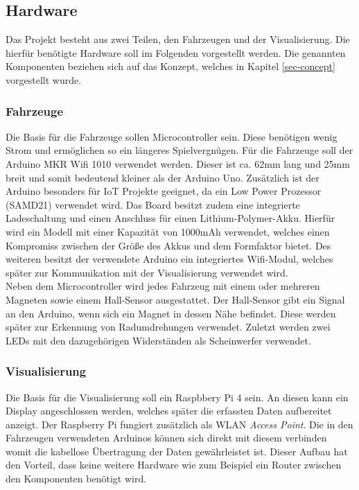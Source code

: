 \documentclass[.../Dokumentation.tex]{subfiles}
\begin{document}
\subsection{Hardware}\label{sec-components-hardware}
Das Projekt besteht aus zwei Teilen, den Fahrzeugen und der Visualisierung.
Die hierfür benötigte Hardware soll im Folgenden vorgestellt werden.
Die genannten Komponenten beziehen sich auf das Konzept, welches in Kapitel 
\ref{sec-concept} vorgestellt wurde.
\subsubsection{Fahrzeuge}
Die Basis für die Fahrzeuge sollen Microcontroller sein. Diese benötigen 
wenig Strom und ermöglichen so ein längeres Spielvergnügen. 
Für die Fahrzeuge soll der Arduino MKR Wifi 1010 verwendet %
werden. Dieser ist 
ca. 62mm lang und 25mm breit und somit bedeutend kleiner als der Arduino Uno. 
Zusätzlich ist der Arduino besonders für IoT Projekte geeignet, da ein Low 
Power Prozessor (SAMD21) verwendet wird. Das Board besitzt zudem eine 
integrierte Ladeschaltung und einen Anschluss für einen Lithium-Polymer-Akku. 
Hierfür wird ein Modell mit einer Kapazität von 1000mAh verwendet, welches 
einen Kompromiss zwischen der Größe des Akkus und dem Formfaktor bietet. 
Des 
weiteren besitzt der verwendete Arduino ein integriertes Wifi-Modul, welches 
später zur Kommunikation mit der Visualisierung verwendet wird. \\
Neben dem Microcontroller wird jedes Fahrzeug mit einem oder mehreren Magneten sowie einem 
Hall-Sensor ausgestattet. Der Hall-Sensor gibt ein Signal an den Arduino, 
wenn sich ein Magnet in dessen Nähe befindet. Diese werden später zur Erkennung 
von Radumdrehungen verwendet. Zuletzt werden zwei LEDs mit den dazugehörigen 
Widerständen als Scheinwerfer verwendet.

\subsubsection{Visualisierung}
Die Basis für die Visualisierung soll ein Raspbbery Pi 4 sein. An diesen kann 
ein Display angeschlossen werden, welches später die erfassten Daten 
aufbereitet anzeigt. Der Raspberry Pi fungiert zusätzlich als WLAN 
\textit{Access Point}. Die in den Fahrzeugen verwendeten Arduinos können sich 
direkt mit diesem verbinden womit die kabellose Übertragung der Daten 
gewährleistet ist. Dieser Aufbau hat den Vorteil, dass keine weitere 
Hardware wie zum Beispiel ein Router zwischen den Komponenten benötigt wird.
\end{document}
